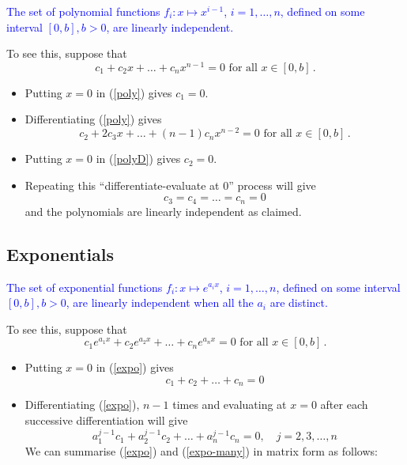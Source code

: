 \documentclass{article}
\begin{document}
\textcolor{blue}{The set of polynomial functions $f_i : x \mapsto x^{i-1}$, $i = 1, \ldots, n$, defined on some interval $[0, b], b > 0$, are linearly independent.}

To see this, suppose that
\begin{equation}
\label{poly}
c_1 + c_2 x + \ldots + c_n x^{n-1} = 0 \mbox{   for all   } x \in [0, b]\,.
\end{equation}
\begin{itemize}
\item
Putting $x = 0$ in (\ref{poly}) gives $c_1 = 0$. 
\item
Differentiating (\ref{poly}) gives
\begin{equation}
\label{polyD}
c_2+ 2 c_3 x + \ldots + (n-1) c_n x^{n-2} = 0 \mbox{   for all   } x \in [0, b]\,.
\end{equation}
\item
Putting $x = 0$ in (\ref{polyD}) gives $c_2 = 0.$ 
\item
Repeating this ``differentiate-evaluate at $0$'' process will give
$$
c_3 = c_4 = \ldots = c_n = 0
$$
and the polynomials are linearly independent as claimed.
\end{itemize}

\subsection{Exponentials}

\textcolor{blue}{The set of exponential functions $f_i : x \mapsto e^{a_i x}$, $i = 1, \ldots, n$, defined on some interval $[0, b], b > 0$, are linearly independent
when all the $a_i$ are distinct.}

To see this, suppose that
\begin{equation}
\label{expo}
c_1 e^{a_1 x} + c_2 e^{a_2 x} + \ldots + c_n e^{a_n x} = 0 \mbox{   for all   } x \in [0, b]\,.
\end{equation}
\begin{itemize}
\item
Putting $x = 0$ in (\ref{expo}) gives 
$$
c_1 + c_2 + \ldots + c_n = 0
$$
\item
Differentiating (\ref{expo}), $n-1$ times and evaluating at $x = 0$ after each successive differentiation will give
\begin{equation}
\label{expo-many}
a_1^{j-1} c_1 + a_2^{j-1} c_2 + \ldots + a_n^{j-1} c_n = 0, \quad j = 2, 3, \ldots, n
\end{equation}
We can summarise (\ref{expo}) and (\ref{expo-many}) in matrix form as follows:
\end{itemize}
\end{document}
